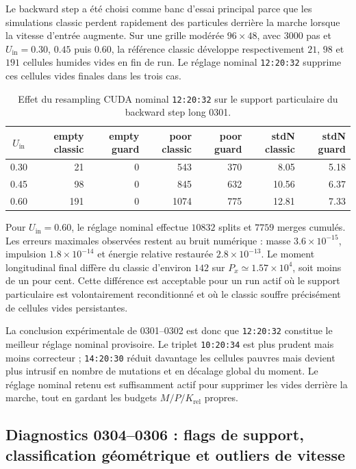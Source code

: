 \documentclass[11pt,a4paper]{article}
\begin{document}
Le backward step a été choisi comme banc d'essai principal parce que les simulations classic perdent rapidement des particules derrière la marche lorsque la vitesse d'entrée augmente. Sur une grille modérée $96\times48$, avec $3000$ pas et $U_{\mathrm{in}}=0.30$, $0.45$ puis $0.60$, la référence classic développe respectivement $21$, $98$ et $191$ cellules humides vides en fin de run. Le réglage nominal \texttt{12:20:32} supprime ces cellules vides finales dans les trois cas.

\begin{table}[htbp]
\centering
\footnotesize
\begin{tabular}{c r r r r r r}
\toprule
$U_{\mathrm{in}}$ & empty classic & empty guard & poor classic & poor guard & stdN classic & stdN guard \\
\midrule
0.30 & 21 & 0 & 543 & 370 & 8.05 & 5.18 \\
0.45 & 98 & 0 & 845 & 632 & 10.56 & 6.37 \\
0.60 & 191 & 0 & 1074 & 775 & 12.81 & 7.33 \\
\bottomrule
\end{tabular}
\caption{Effet du resampling CUDA nominal \texttt{12:20:32} sur le support particulaire du backward step long 0301.}
\end{table}

Pour $U_{\mathrm{in}}=0.60$, le réglage nominal effectue $10832$ splits et $7759$ merges cumulés. Les erreurs maximales observées restent au bruit numérique : masse $3.6\times10^{-15}$, impulsion $1.8\times10^{-14}$ et énergie relative restaurée $2.8\times10^{-13}$. Le moment longitudinal final diffère du classic d'environ $142$ sur $P_x\simeq1.57\times10^4$, soit moins de un pour cent. Cette différence est acceptable pour un run actif où le support particulaire est volontairement reconditionné et où le classic souffre précisément de cellules vides persistantes.

La conclusion expérimentale de 0301--0302 est donc que \texttt{12:20:32} constitue le meilleur réglage nominal provisoire. Le triplet \texttt{10:20:34} est plus prudent mais moins correcteur ; \texttt{14:20:30} réduit davantage les cellules pauvres mais devient plus intrusif en nombre de mutations et en décalage global du moment. Le réglage nominal retenu est suffisamment actif pour supprimer les vides derrière la marche, tout en gardant les budgets $M/P/K_{\mathrm{rel}}$ propres.


\subsection{Diagnostics 0304--0306 : flags de support, classification géométrique et outliers de vitesse}
\end{document}
